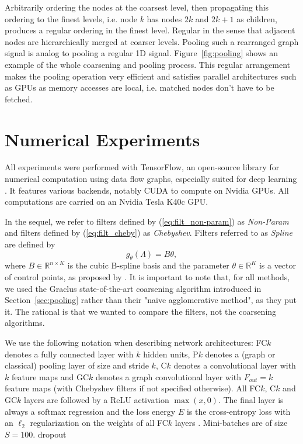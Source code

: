 \documentclass{article}
\newcommand{\R}{\mathbb{R}}
\newcommand{\figref}[1]{Figure~\ref{fig:#1}}
\newcommand{\secref}[1]{Section~\ref{sec:#1}}
\newcommand{\eqnref}[1]{(\ref{eq:#1})}
\newcommand{\bruna}{art:BrunaZarembaSzlamLeCun13DLgraphs,
art:HenaffBrunaLeCun15DLgraphs}
\newcommand{\todo}[1]{{\color{red} #1 }}
\begin{document}
Arbitrarily ordering the nodes at the coarsest level, then propagating this
ordering to the finest levels, i.e. node $k$ has nodes $2k$ and $2k+1$ as
children, produces a regular ordering in the finest level. Regular in the sense
that adjacent nodes are hierarchically merged at coarser levels. Pooling such a
rearranged graph signal is analog to pooling a regular 1D signal.
\figref{pooling} shows an example of the whole coarsening and pooling process.
This regular arrangement makes the pooling operation very efficient and
satisfies parallel architectures such as GPUs as memory accesses are local, i.e.
matched nodes don't have to be fetched.

\section{Numerical Experiments}

All experiments were performed with TensorFlow, an open-source library for
numerical computation using data flow graphs, especially suited for deep
learning \cite{abadi_tensorflow_2016}. It features various backends, notably
CUDA to compute on Nvidia GPUs. All computations are carried on an Nvidia Tesla
K40c GPU.

In the sequel, we refer to filters defined by \eqnref{filt_non-param} as
\textit{Non-Param} and filters defined by \eqnref{filt_cheby} as
\textit{Chebyshev}. Filters referred to as \textit{Spline} are defined by
\begin{equation} \label{eq:filt_spline}
	g_\theta(\Lambda) = B \theta,
\end{equation}
where $B \in \R^{n \times K}$ is the cubic B-spline basis and the parameter
$\theta \in \R^K$ is a vector of control points, as proposed by \cite{\bruna}. It is
important to note that, for all methods, we used the Graclus state-of-the-art
coarsening algorithm introduced in \secref{pooling} rather than their "naive
agglomerative method", as they put it. The rational is that we wanted to compare
the filters, not the coarsening algorithms.

We use the following notation when describing network architectures: FC$k$
denotes a fully connected layer with $k$ hidden units, P$k$ denotes a (graph or
classical) pooling layer of size and stride $k$, C$k$ denotes a convolutional
layer with $k$ feature maps and GC$k$ denotes a graph convolutional layer with
$F_{out} = k$ feature maps (with Chebyshev filters if not specified otherwise).
All FC$k$, C$k$ and GC$k$ layers are followed by a ReLU activation $\max(x,0)$.
The final layer is always a softmax regression and the loss energy $E$ is the
cross-entropy loss \todo{with an $\ell_2$ regularization on the weights of all
FC$k$ layers}. Mini-batches are of size $S = 100$.  \todo{dropout}
\end{document}
